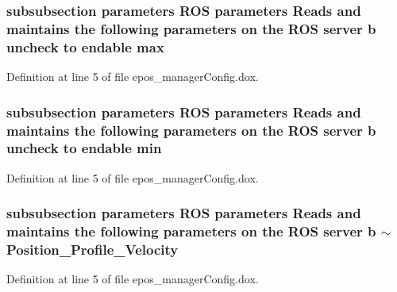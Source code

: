 \subsubsection[{max}]{\setlength{\rightskip}{0pt plus 5cm}subsubsection parameters \-R\-O\-S parameters \-Reads and maintains the following parameters on the \-R\-O\-S server b uncheck to endable {\bf max}}\label{epos__managerConfig_8dox_a0a819a560144cee6323a0be3792d8447}


\-Definition at line 5 of file epos\-\_\-manager\-Config.\-dox.

\subsubsection[{min}]{\setlength{\rightskip}{0pt plus 5cm}subsubsection parameters \-R\-O\-S parameters \-Reads and maintains the following parameters on the \-R\-O\-S server b uncheck to endable {\bf min}}\label{epos__managerConfig_8dox_a6642d0575df2282ce8200c40eb0ca2f5}


\-Definition at line 5 of file epos\-\_\-manager\-Config.\-dox.

\subsubsection[{$\sim$\-Position\-\_\-\-Profile\-\_\-\-Velocity}]{\setlength{\rightskip}{0pt plus 5cm}subsubsection parameters \-R\-O\-S parameters \-Reads and maintains the following parameters on the \-R\-O\-S server b $\sim$\-Position\-\_\-\-Profile\-\_\-\-Velocity}\label{epos__managerConfig_8dox_a93c1375bc21f47d13dfa69c3ba5302e0}


\-Definition at line 5 of file epos\-\_\-manager\-Config.\-dox.

